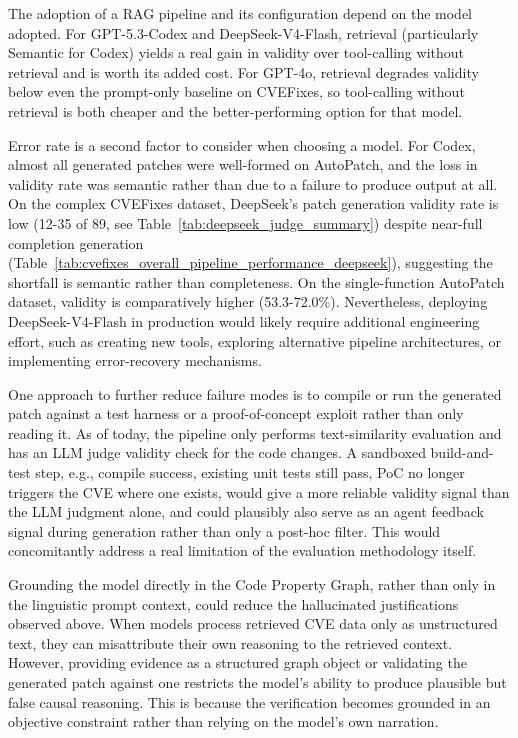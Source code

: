 The adoption of a RAG pipeline and its configuration depend on the model adopted. 
For GPT-5.3-Codex and DeepSeek-V4-Flash, retrieval (particularly Semantic for Codex) yields a real gain in validity over tool-calling without retrieval and is worth its added cost. 
For GPT-4o, retrieval degrades validity below even the prompt-only baseline on CVEFixes, so tool-calling without retrieval is both cheaper and the better-performing option for that model.

Error rate is a second factor to consider when choosing a model. 
For Codex, almost all generated patches were well-formed on AutoPatch, and the loss in validity rate was semantic rather than due to a failure to produce output at all. 
On the complex CVEFixes dataset, DeepSeek's patch generation validity rate is low (12-35 of 89, see Table~\ref{tab:deepseek_judge_summary}) despite near-full completion generation (Table~\ref{tab:cvefixes_overall_pipeline_performance_deepseek}), suggesting the shortfall is semantic rather than completeness. 
On the single-function AutoPatch dataset, validity is comparatively higher (53.3-72.0\%). 
Nevertheless, deploying DeepSeek-V4-Flash in production would likely require additional engineering effort, such as creating new tools, exploring alternative pipeline architectures, or implementing error-recovery mechanisms.

One approach to further reduce failure modes is to compile or run the generated patch against a test harness or a proof-of-concept exploit rather than only reading it.
As of today, the pipeline only performs text-similarity evaluation and has an LLM judge validity check for the code changes. 
A sandboxed build-and-test step, e.g., compile success, existing unit tests still pass, PoC no longer triggers the CVE where one exists, would give a more reliable validity signal than the LLM judgment alone, and could plausibly also serve as an agent feedback signal during generation rather than only a post-hoc filter. This would concomitantly address a real limitation of the evaluation methodology itself.
 
Grounding the model directly in the Code Property Graph, rather than only in the linguistic prompt context, could reduce the hallucinated justifications observed above. 
When models process retrieved CVE data only as unstructured text, they can misattribute their own reasoning to the retrieved context. However, providing evidence as a structured graph object or validating the generated patch against one restricts the model's ability to produce plausible but false causal reasoning. This is because the verification becomes grounded in an objective constraint rather than relying on the model's own narration.


